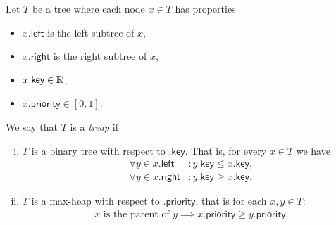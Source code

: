 \begin{defn}[Treap]
Let $T$ be a tree where each node $x \in T$ has properties
\begin{itemize}
    \item $x\textsf{.left}$ is the left subtree of $x$,
    \item $x\textsf{.right}$ is the right subtree of $x$,
    \item $x\textsf{.key} \in \mathbb{R}$,
    \item $x\textsf{.priority} \in [0,1]$.
\end{itemize}
We say that $T$ is a \textit{treap} if
\begin{enumerate}[(i)]
    \item $T$ is a binary tree with respect to $\textsf{.key}$. That is, for every $x \in T$ we have
    \begin{align*}
        \forall y \in x\textsf{.left} &\colon y\textsf{.key} \leq x\textsf{.key}, \\
        \forall y \in x\textsf{.right} &\colon y\textsf{.key} \geq x\textsf{.key}.
    \end{align*}
    \item $T$ is a max-heap with respect to $\textsf{.priority}$, that is for each $x, y \in T$:
    \begin{align*}
        x \text{ is the parent of } y \implies x\textsf{.priority} \geq y\textsf{.priority}.
    \end{align*}
\end{enumerate}
\end{defn}

